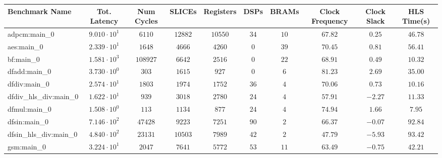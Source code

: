 \begin{tabular}{|l|c|c|c|c|c|c|c|c|c|}
\hline
Benchmark Name          & Tot. Latency           & Num Cycles & SLICEs    & Registers & DSPs    & BRAMs   & Clock Frequency & Clock Slack & HLS Time(s) \\
\hline
adpcm:main\_0           & $ 9.010 \cdot 10^{1} $ & $ 6110   $ & $ 12882 $ & $ 10550 $ & $ 34  $ & $ 10  $ & $ 67.82       $ & $ 0.25    $ & $ 46.78   $ \\
aes:main\_0             & $ 2.339 \cdot 10^{1} $ & $ 1648   $ & $ 4666  $ & $ 4260  $ & $ 0   $ & $ 39  $ & $ 70.45       $ & $ 0.81    $ & $ 56.41   $ \\
bf:main\_0              & $ 1.581 \cdot 10^{3} $ & $ 108927 $ & $ 6642  $ & $ 2516  $ & $ 0   $ & $ 22  $ & $ 68.91       $ & $ 0.49    $ & $ 10.32   $ \\
dfadd:main\_0           & $ 3.730 \cdot 10^{0} $ & $ 303    $ & $ 1615  $ & $ 927   $ & $ 0   $ & $ 6   $ & $ 81.23       $ & $ 2.69    $ & $ 35.00   $ \\
dfdiv:main\_0           & $ 2.574 \cdot 10^{1} $ & $ 1803   $ & $ 1974  $ & $ 1752  $ & $ 36  $ & $ 4   $ & $ 70.06       $ & $ 0.73    $ & $ 10.16   $ \\
dfdiv\_hls\_div:main\_0 & $ 1.622 \cdot 10^{1} $ & $ 939    $ & $ 3018  $ & $ 2780  $ & $ 24  $ & $ 4   $ & $ 57.91       $ & $ -2.27   $ & $ 11.33   $ \\
dfmul:main\_0           & $ 1.508 \cdot 10^{0} $ & $ 113    $ & $ 1134  $ & $ 877   $ & $ 24  $ & $ 4   $ & $ 74.94       $ & $ 1.66    $ & $ 7.95    $ \\
dfsin:main\_0           & $ 7.146 \cdot 10^{2} $ & $ 47428  $ & $ 9223  $ & $ 7251  $ & $ 90  $ & $ 2   $ & $ 66.37       $ & $ -0.07   $ & $ 92.84   $ \\
dfsin\_hls\_div:main\_0 & $ 4.840 \cdot 10^{2} $ & $ 23131  $ & $ 10503 $ & $ 7989  $ & $ 42  $ & $ 2   $ & $ 47.79       $ & $ -5.93   $ & $ 93.42   $ \\
gsm:main\_0             & $ 3.224 \cdot 10^{1} $ & $ 2047   $ & $ 7641  $ & $ 5772  $ & $ 53  $ & $ 11  $ & $ 63.49       $ & $ -0.75   $ & $ 42.21   $ \\

\end{tabular}
